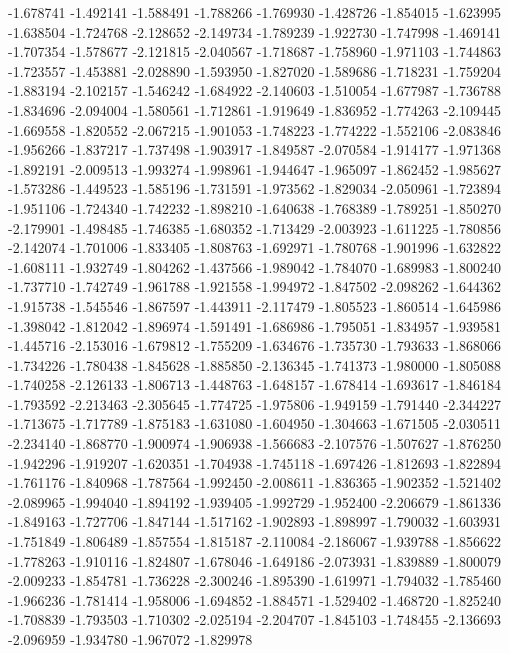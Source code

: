 -1.678741
-1.492141
-1.588491
-1.788266
-1.769930
-1.428726
-1.854015
-1.623995
-1.638504
-1.724768
-2.128652
-2.149734
-1.789239
-1.922730
-1.747998
-1.469141
-1.707354
-1.578677
-2.121815
-2.040567
-1.718687
-1.758960
-1.971103
-1.744863
-1.723557
-1.453881
-2.028890
-1.593950
-1.827020
-1.589686
-1.718231
-1.759204
-1.883194
-2.102157
-1.546242
-1.684922
-2.140603
-1.510054
-1.677987
-1.736788
-1.834696
-2.094004
-1.580561
-1.712861
-1.919649
-1.836952
-1.774263
-2.109445
-1.669558
-1.820552
-2.067215
-1.901053
-1.748223
-1.774222
-1.552106
-2.083846
-1.956266
-1.837217
-1.737498
-1.903917
-1.849587
-2.070584
-1.914177
-1.971368
-1.892191
-2.009513
-1.993274
-1.998961
-1.944647
-1.965097
-1.862452
-1.985627
-1.573286
-1.449523
-1.585196
-1.731591
-1.973562
-1.829034
-2.050961
-1.723894
-1.951106
-1.724340
-1.742232
-1.898210
-1.640638
-1.768389
-1.789251
-1.850270
-2.179901
-1.498485
-1.746385
-1.680352
-1.713429
-2.003923
-1.611225
-1.780856
-2.142074
-1.701006
-1.833405
-1.808763
-1.692971
-1.780768
-1.901996
-1.632822
-1.608111
-1.932749
-1.804262
-1.437566
-1.989042
-1.784070
-1.689983
-1.800240
-1.737710
-1.742749
-1.961788
-1.921558
-1.994972
-1.847502
-2.098262
-1.644362
-1.915738
-1.545546
-1.867597
-1.443911
-2.117479
-1.805523
-1.860514
-1.645986
-1.398042
-1.812042
-1.896974
-1.591491
-1.686986
-1.795051
-1.834957
-1.939581
-1.445716
-2.153016
-1.679812
-1.755209
-1.634676
-1.735730
-1.793633
-1.868066
-1.734226
-1.780438
-1.845628
-1.885850
-2.136345
-1.741373
-1.980000
-1.805088
-1.740258
-2.126133
-1.806713
-1.448763
-1.648157
-1.678414
-1.693617
-1.846184
-1.793592
-2.213463
-2.305645
-1.774725
-1.975806
-1.949159
-1.791440
-2.344227
-1.713675
-1.717789
-1.875183
-1.631080
-1.604950
-1.304663
-1.671505
-2.030511
-2.234140
-1.868770
-1.900974
-1.906938
-1.566683
-2.107576
-1.507627
-1.876250
-1.942296
-1.919207
-1.620351
-1.704938
-1.745118
-1.697426
-1.812693
-1.822894
-1.761176
-1.840968
-1.787564
-1.992450
-2.008611
-1.836365
-1.902352
-1.521402
-2.089965
-1.994040
-1.894192
-1.939405
-1.992729
-1.952400
-2.206679
-1.861336
-1.849163
-1.727706
-1.847144
-1.517162
-1.902893
-1.898997
-1.790032
-1.603931
-1.751849
-1.806489
-1.857554
-1.815187
-2.110084
-2.186067
-1.939788
-1.856622
-1.778263
-1.910116
-1.824807
-1.678046
-1.649186
-2.073931
-1.839889
-1.800079
-2.009233
-1.854781
-1.736228
-2.300246
-1.895390
-1.619971
-1.794032
-1.785460
-1.966236
-1.781414
-1.958006
-1.694852
-1.884571
-1.529402
-1.468720
-1.825240
-1.708839
-1.793503
-1.710302
-2.025194
-2.204707
-1.845103
-1.748455
-2.136693
-2.096959
-1.934780
-1.967072
-1.829978
